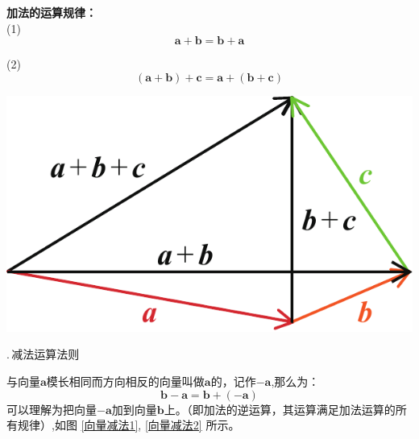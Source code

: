 \begin{minipage}{0.55\linewidth}
\noindent \textbf{加法的运算规律：}\\
(1)$\,$ 
\vspace*{-0.5em}
\begin{equation}
	\boldsymbol{a}+\boldsymbol{b}=\boldsymbol{b}+\boldsymbol{a} 
\end{equation}
\vspace*{-2em}

(2)$\,$ 
\vspace*{-1em}
\begin{equation}
	(\bm{a} + \bm{b}) + \bm{c} = \bm{a} + (\bm{b} + \bm{c})
\end{equation}
\vspace*{-0.3em}
\end{minipage}
\begin{minipage}{0.45\linewidth}
	\centering
	\includegraphics[width = 0.7\linewidth]{pic/C-5/vecadd3}
	\vspace*{-1em}
	\label{向量加法的运算规律}
\end{minipage}
\vspace*{0.5em}

.$\,$减法运算法则\\
\vspace*{-1em}\vspace*{-1em}

与向量$\boldsymbol{a}$模长相同而方向相反的向量叫做$\boldsymbol{a}$的，记作$-\boldsymbol{a}$,那么为：
\begin{equation}
	\boldsymbol{b}-\boldsymbol{a}=\boldsymbol{b}+(-\boldsymbol{a})
\end{equation}
可以理解为把向量$-\boldsymbol{a}$加到向量$\boldsymbol{b}$上。（即加法的逆运算，其运算满足加法运算的所有规律）,如图 \ref{向量减法1}, \ref{向量减法2} 所示。

